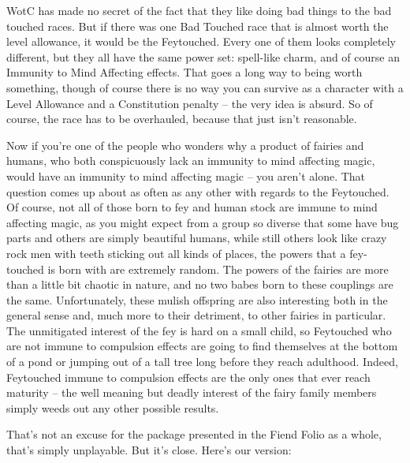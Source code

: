 
\vspace*{-8pt}

WotC has made no secret of the fact that they like doing bad things to the bad touched races. But if there was one Bad Touched race that is almost worth the level allowance, it would be the Feytouched. Every one of them looks completely different, but they all have the same power set: spell-like charm, and of course an Immunity to Mind Affecting effects. That goes a long way to being worth something, though of course there is no way you can survive as a character with a Level Allowance and a Constitution penalty -- the very idea is absurd. So of course, the race has to be overhauled, because that just isn't reasonable.

Now if you're one of the people who wonders why a product of fairies and humans, who both conspicuously lack an immunity to mind affecting magic, would have an immunity to mind affecting magic -- you aren't alone. That question comes up about as often as any other with regards to the Feytouched. Of course, not all of those born to fey and human stock are immune to mind affecting magic, as you might expect from a group so diverse that some have bug parts and others are simply beautiful humans, while still others look like crazy rock men with teeth sticking out all kinds of places, the powers that a fey-touched is born with are extremely random. The powers of the fairies are more than a little bit chaotic in nature, and no two babes born to these couplings are the same. Unfortunately, these mulish offspring are also interesting both in the general sense and, much more to their detriment, to other fairies in particular. The unmitigated interest of the fey is hard on a small child, so Feytouched who are not immune to compulsion effects are going to find themselves at the bottom of a pond or jumping out of a tall tree long before they reach adulthood. Indeed, Feytouched immune to compulsion effects are the only ones that ever reach maturity -- the well meaning but deadly interest of the fairy family members simply weeds out any other possible results.

That's not an excuse for the package presented in the Fiend Folio as a whole, that's simply unplayable. But it's close. Here's our version:

